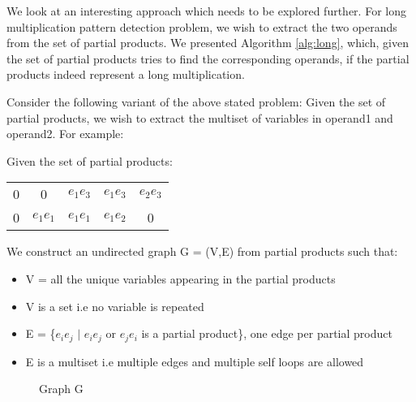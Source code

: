 We look at an interesting approach which needs to be explored further. For long multiplication pattern detection problem, we wish to extract the two operands from the set of partial products. We presented Algorithm \ref{alg:long}, which, given the set of partial products tries to find the corresponding operands, if the partial products indeed represent a long multiplication. 

Consider the following variant of the above stated problem: Given the set of partial products, we wish to extract the multiset of variables in operand1 and operand2. For example:

Given the set of partial products:

\begin{center}

\begin{tabu}{c c c c c}


0 & 0 & $e_1 e_3$ & $e_1 e_3$ & $e_2 e_3$ \\

0 & $e_1 e_1$ & $e_1 e_1$  & $e_1 e_2$ & 0\\

\end{tabu}
\end{center}

We construct an undirected graph G = (V,E) from partial products such that:

\begin{itemize}
\item V = all the unique variables appearing in the partial products
\item V is a set i.e no variable is repeated
\item E = \{$e_i e_j$ $\mid$ $e_i e_j$ or $e_j e_i$ is a partial product\}, one edge per partial product
\item E is a multiset i.e multiple edges and multiple self loops are allowed
\end{itemize}

\begin{figure}

\begin{center}


\caption{Graph G}

\end{center}
\end{figure}

